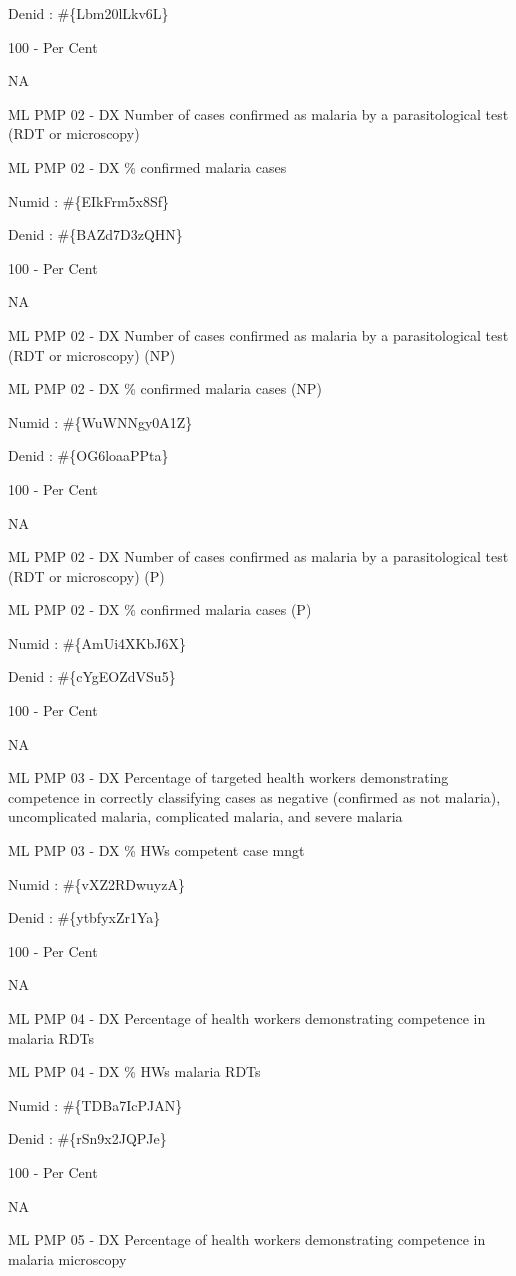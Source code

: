 \documentclass[]{book}
\begin{document}
Denid : \#\{Lbm20lLkv6L\}

100 - Per Cent

NA

ML PMP 02 - DX Number of cases confirmed as malaria by a parasitological test (RDT or microscopy)

ML PMP 02 - DX \% confirmed malaria cases

Numid : \#\{EIkFrm5x8Sf\}

Denid : \#\{BAZd7D3zQHN\}

100 - Per Cent

NA

ML PMP 02 - DX Number of cases confirmed as malaria by a parasitological test (RDT or microscopy) (NP)

ML PMP 02 - DX \% confirmed malaria cases (NP)

Numid : \#\{WuWNNgy0A1Z\}

Denid : \#\{OG6loaaPPta\}

100 - Per Cent

NA

ML PMP 02 - DX Number of cases confirmed as malaria by a parasitological test (RDT or microscopy) (P)

ML PMP 02 - DX \% confirmed malaria cases (P)

Numid : \#\{AmUi4XKbJ6X\}

Denid : \#\{cYgEOZdVSu5\}

100 - Per Cent

NA

ML PMP 03 - DX Percentage of targeted health workers demonstrating competence in correctly classifying cases as negative (confirmed as not malaria), uncomplicated malaria, complicated malaria, and severe malaria

ML PMP 03 - DX \% HWs competent case mngt

Numid : \#\{vXZ2RDwuyzA\}

Denid : \#\{ytbfyxZr1Ya\}

100 - Per Cent

NA

ML PMP 04 - DX Percentage of health workers demonstrating competence in malaria RDTs

ML PMP 04 - DX \% HWs malaria RDTs

Numid : \#\{TDBa7IcPJAN\}

Denid : \#\{rSn9x2JQPJe\}

100 - Per Cent

NA

ML PMP 05 - DX Percentage of health workers demonstrating competence in malaria microscopy
\end{document}
